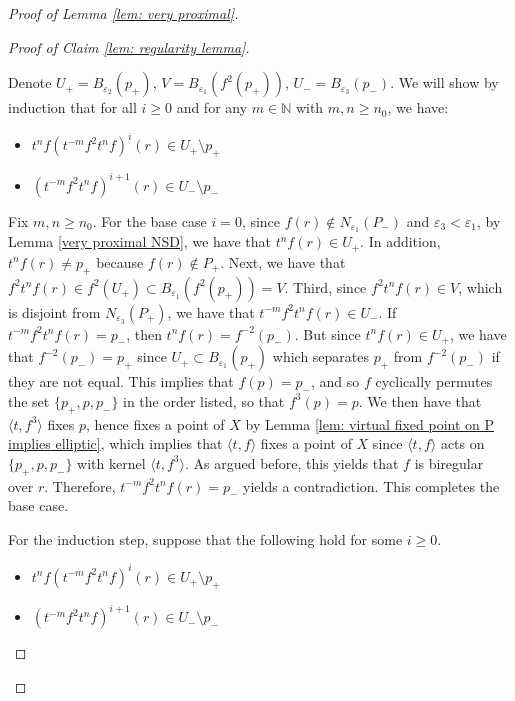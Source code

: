\documentclass[12pt]{article}
\theoremstyle{definition}
\newcommand{\N}{\mathbb{N}}
\newcommand{\ve}{\varepsilon}
\begin{document}
\begin{proof} [Proof of Lemma \ref{lem: very proximal}]
\begin{proof}[Proof of Claim \ref{lem: regularity lemma}]
\begin{enumerate}
\begin{enumerate}
\begin{enumerate}
    Denote $U_+ = B_{\ve_2}(p_+)$, $V = B_{\ve_1}(f^2(p_+))$, $U_- = B_{\ve_3}(p_-)$. We will show by induction that for all $i \geq 0$ and for any $m \in \N$ with $m,n \geq n_0$, we have: 

    \begin{itemize}
        \item $t^n f(t^{-m}f^2 t^n f)^i(r) \in U_+ \setminus p_+$
        \item $(t^{-m}f^2 t^n f)^{i+1}(r) \in U_- \setminus p_-$
    \end{itemize}

    Fix $m,n \geq n_0$. For the base case $i=0$, since $f(r) \notin N_{\ve_1}(P_-)$ and $\ve_3 < \ve_1$, by Lemma \ref{very proximal NSD}, we have that $t^n f(r) \in U_+$. In addition, $t^n f(r) \neq p_+$ because $f(r) \notin P_+$. 
    Next, we have that $f^2t^n f(r) \in f^2(U_+) \subset B_{\ve_1}(f^2(p_+)) = V$.
    Third, since $f^2 t^n f(r) \in V$, which is disjoint from $N_{\ve_3}(P_+)$, we have that $t^{-m}f^2 t^n f(r) \in U_-$. If $t^{-m}f^2 t^n f(r) = p_-$, then $t^n f(r) = f^{-2}(p_-)$. But since $t^n f(r) \in U_+$, we have that $f^{-2}(p_-) = p_+$ since $U_+ \subset B_{\ve_1}(p_+)$ which separates $p_+$ from $f^{-2}(p_-)$ if they are not equal. This implies that $f(p) = p_-$, and so $f$ cyclically permutes the set $\{p_+, p, p_-\}$ in the order listed, so that $f^3(p) = p$. We then have that $\langle t, f^3 \rangle$ fixes $p$, hence fixes a point of $X$ by Lemma \ref{lem: virtual fixed point on P implies elliptic}, which implies that $\langle t, f \rangle$ fixes a point of $X$ since $\langle t, f \rangle$ acts on $\{p_+, p, p_-\}$ with kernel $\langle t, f^3 \rangle$. As argued before, this yields that $f$ is biregular over $r$. Therefore, $t^{-m}f^2 t^n f(r) = p_-$ yields a contradiction. 
    This completes the base case. 

    For the induction step, suppose that the following hold for some $i \geq 0$. 

    \begin{itemize}
        \item $t^n f(t^{-m}f^2 t^n f)^i(r) \in U_+ \setminus p_+$
        \item $(t^{-m}f^2 t^n f)^{i+1}(r) \in U_- \setminus p_-$
    \end{itemize}


\end{enumerate}
\end{enumerate}
\end{enumerate}
\end{proof}
\end{proof}
\end{document}
